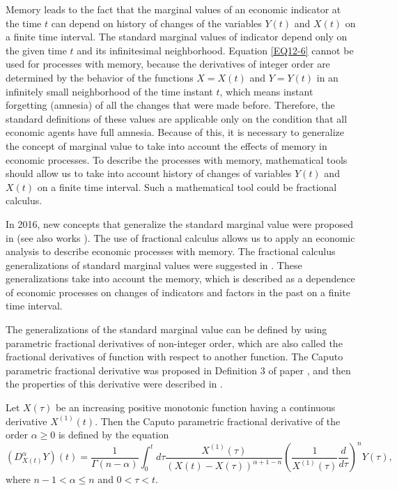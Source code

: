 \documentclass[12pt]{article}
\begin{document}
Memory leads to the fact that the marginal values of an economic indicator at the time $t$ can depend on history of changes of the variables $Y(t)$ and $X(t)$ on a finite time interval. 
The standard marginal values of indicator depend only on the given time $t$ and its infinitesimal neighborhood. 
Equation \eqref{EQ12-6} cannot be used for processes with memory, because the derivatives of integer order 
are determined by the behavior of the functions 
$X =X(t)$ and $Y=Y(t)$ in an infinitely small neighborhood of the time instant $t$, which means instant forgetting (amnesia) of all the changes that were made before.
Therefore, the standard definitions of these values are applicable only on the condition that all economic agents have full amnesia. Because of this, it is necessary to generalize the concept of marginal value to take into account the effects of memory in economic processes. 
To describe the processes with memory, mathematical tools should allow us to take into account history of changes of variables $Y(t)$ and $X(t)$ on a finite time interval. 
Such a mathematical tool could be fractional calculus.



In 2016, new concepts that generalize the standard marginal value were proposed in \cite{Margin1,Margin2,Margin3} 
(see also works \cite{Margin4,Margin5,Interpret,BOOK-DG-2021}). 
The use of fractional calculus allows us to apply an economic analysis to describe economic processes with memory. 
The fractional calculus generalizations of standard marginal values were suggested in \cite{Margin1,Margin2,Margin3,Margin4,Margin5,BOOK-DG-2021}. 
These generalizations take into account the memory, which is described as a dependence of economic processes on changes 
of indicators and factors in the past on a finite time interval. 


The generalizations of the standard marginal value 
can be defined by using parametric fractional derivatives of non-integer order, which are also called the fractional derivatives of function with respect to another function. 
The Caputo parametric fractional derivative was proposed in Definition 3 of paper \cite[p.~224]{Elasticity1}, and then the properties of this derivative were described in \cite{Almeida-1}. 

Let $X(\tau)$ be an increasing positive monotonic function having a continuous derivative $X^{(1)}(t)$. 
Then the Caputo parametric fractional derivative of the order $\alpha \ge 0$ is defined by the equation
\begin{dmath} \label{EQ12C-1}
\left(D^{\alpha}_{X(t)} Y\right)(t) = 
\frac{1}{\Gamma (n -\alpha)} \int^t_0 d\tau 
\frac{X^{(1)}(\tau)}{(X(t)-X(\tau))^{\alpha +1-n}} 
\left( \frac{1}{X^{(1)}(\tau)}
\frac{d}{d\tau}\right)^n Y (\tau) , 
\end{dmath} 
where $n - 1 < \alpha \le n$ and $0<\tau <t$. 
\end{document}
